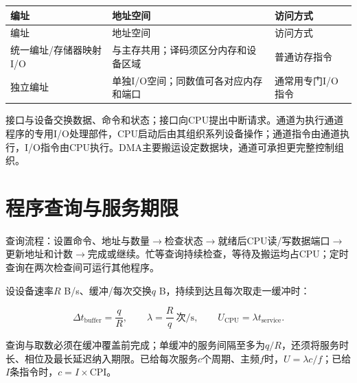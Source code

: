 \par\smallskip
\begin{wideblock}
{\fontsize{9.3}{12}\selectfont\setlength{\tabcolsep}{2.5pt}\setlength{\LTleft}{0pt}\setlength{\LTright}{0pt}
\begin{longtable}{@{}>{\raggedright\arraybackslash}p{}>{\raggedright\arraybackslash}p{}>{\raggedright\arraybackslash}p{}@{}}
\toprule
编址 & 地址空间 & 访问方式 \\

\midrule\endfirsthead\toprule
编址 & 地址空间 & 访问方式 \\

\midrule\endhead\bottomrule\endfoot
统一编址/存储器映射I/O & 与主存共用；译码须区分内存和设备区域 & 普通访存指令 \\

独立编址 & 单独I/O空间；同数值可各对应内存和端口 & 通常用专门I/O指令 \\

\end{longtable}}
\end{wideblock}
\par\smallskip

接口与设备交换数据、命令和状态；接口向CPU提出中断请求。通道为执行通道程序的专用I/O处理部件，CPU启动后由其组织系列设备操作；通道指令由通道执行，I/O指令由CPU执行。DMA主要搬运设定数据块，通道可承担更完整控制组织。

\section{程序查询与服务期限}\label{CO07-polling}

查询流程：设置命令、地址与数量\ensuremath{\to}检查状态\ensuremath{\to}就绪后CPU读/写数据端口\ensuremath{\to}更新地址和计数\ensuremath{\to}完成或继续。忙等查询持续检查，等待及搬运均占CPU；定时查询在两次检查间可运行其他程序。

设设备速率\(R\) B/s、缓冲/每次交换\(q\) B，持续到达且每次取走一缓冲时：

\[
\Delta t_{\mathrm{buffer}}=\frac qR,\qquad
\lambda=\frac Rq\ \text{次/s},\qquad
U_{\mathrm{CPU}}=\lambda t_{\mathrm{service}}.
\]

查询与取数必须在缓冲覆盖前完成；单缓冲的服务间隔至多为\(q/R\)，还须将服务时长、相位及最长延迟纳入期限。已给每次服务\(c\)个周期、主频\(f\)时，\(U=\lambda c/f\)；已给\(I\)条指令时，\(c=I\times\mathrm{CPI}\)。

